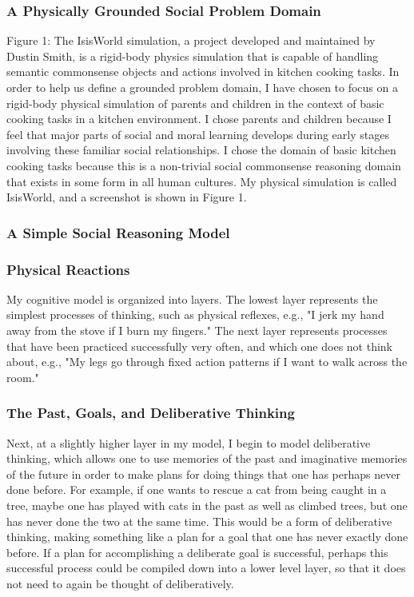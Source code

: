 \subsubsection{A Physically Grounded Social Problem Domain}

Figure 1: The IsisWorld simulation, a project developed and maintained
by Dustin Smith, is a rigid-body physics simulation that is capable of
handling semantic commonsense objects and actions involved in kitchen
cooking tasks.  In order to help us define a grounded problem domain,
I have chosen to focus on a rigid-body physical simulation of parents
and children in the context of basic cooking tasks in a kitchen
environment. I chose parents and children because I feel that major
parts of social and moral learning develops during early stages
involving these familiar social relationships. I chose the domain of
basic kitchen cooking tasks because this is a non-trivial social
commonsense reasoning domain that exists in some form in all human
cultures. My physical simulation is called IsisWorld, and a
screenshot is shown in Figure 1.

\subsubsection{A Simple Social Reasoning Model}

\subsubsection{Physical Reactions}

My cognitive model is organized into layers. The lowest layer
represents the simplest processes of thinking, such as physical
reflexes, e.g., "I jerk my hand away from the stove if I burn my
fingers." The next layer represents processes that have been practiced
successfully very often, and which one does not think about, e.g., "My
legs go through fixed action patterns if I want to walk across the
room."

\subsubsection{The Past, Goals, and Deliberative Thinking}

Next, at a slightly higher layer in my model, I begin to model
deliberative thinking, which allows one to use memories of the past
and imaginative memories of the future in order to make plans for
doing things that one has perhaps never done before. For example, if
one wants to rescue a cat from being caught in a tree, maybe one has
played with cats in the past as well as climbed trees, but one has
never done the two at the same time. This would be a form of
deliberative thinking, making something like a plan for a goal that
one has never exactly done before. If a plan for accomplishing a
deliberate goal is successful, perhaps this successful process could
be compiled down into a lower level layer, so that it does not need to
again be thought of deliberatively.

